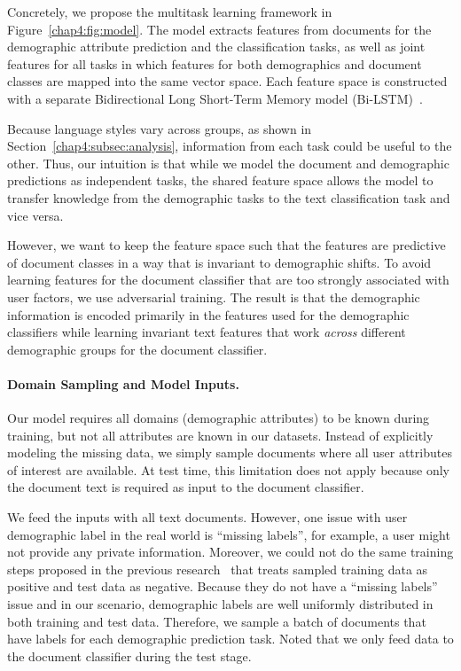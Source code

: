 Concretely, we propose the multitask learning framework in Figure~\ref{chap4:fig:model}. 
The model extracts features from documents for the demographic attribute prediction and the classification tasks, as well as joint features for all tasks in which features for both demographics and document classes are mapped into the same vector space.
Each feature space is constructed with a separate Bidirectional Long Short-Term Memory model (Bi-LSTM)~\cite{hochreiter1997long}.

Because language styles vary across groups, as shown in Section~\ref{chap4:subsec:analysis}, information from each task could be useful to the other.
Thus, our intuition is that while we model the document and demographic predictions as independent tasks, the shared feature space allows the model to transfer knowledge from the demographic tasks to the text classification task and vice versa. 

However, we want to keep the feature space such that the features are predictive of document classes in a way that is invariant to demographic shifts. 
To avoid learning features for the document classifier that are too strongly associated with user factors, 
we use adversarial training.
The result is that the demographic information is encoded primarily in the features used for the demographic classifiers while learning invariant text features that work {\em across} different demographic groups for the document classifier. 

\paragraph{Domain Sampling and Model Inputs.} 
Our model requires all domains (demographic attributes) to be known during training, but not all attributes are known in our datasets.
Instead of explicitly modeling the missing data,
we simply sample documents where all user attributes of interest are available.
At test time, this limitation does not apply because only the document text is required as input to the document classifier.

We feed the inputs with all text documents. However, one issue with user demographic label in the real world is ``missing labels'', for example, a user might not provide any private information. Moreover, we could not do the same training steps proposed in the previous research~\cite{chen2016adversarial} that treats sampled training data as positive and test data as negative. Because they do not have a ``missing labels'' issue and in our scenario, demographic labels are well uniformly distributed in both training and test data. Therefore, we sample a batch of documents that have labels for each demographic prediction task. Noted that we only feed data to the document classifier during the test stage.

